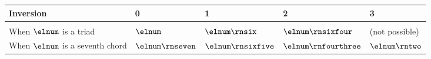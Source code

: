 \begin{tabular}{l|llll}
Inversion & 0 & 1 & 2 & 3 \\ 
\hline \\
When $\elnum$ is a triad & $\elnum$ & $\elnum\rnsix$ & $\elnum\rnsixfour$ & (not possible) \\
When $\elnum$ is a seventh chord & $\elnum\rnseven$ & $\elnum\rnsixfive$ & $\elnum\rnfourthree$ & $\elnum\rntwo$ \\
\end{tabular}
